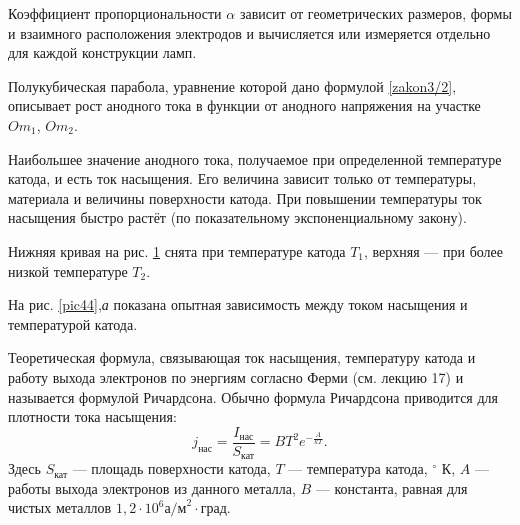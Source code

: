 \documentclass[a4paper,10pt]{book}
\begin{document}
\begin{figure}[h]
	\caption{}
	\label{pic43}
\end{figure}

Коэффициент пропорциональности $\alpha$ зависит от геометрических размеров, формы и взаимного расположения электродов и вычисляется или измеряется отдельно для каждой конструкции ламп.

Полукубическая парабола, уравнение которой дано формулой \ref{zakon3/2}, описывает рост анодного тока в функции от анодного напряжения на участке $Om_1$, $Om_2$.

Наибольшее значение анодного тока, получаемое при определенной температуре катода, и есть ток насыщения. Его величина зависит только от температуры, материала и величины поверхности катода. При повышении температуры ток насыщения быстро растёт (по показательному экспоненциальному закону).

Нижняя кривая на рис. \ref{pic43} снята при температуре катода $T_1$, верхняя — при более низкой температуре $T_2$.

На рис. \ref{pic44},\textit{а} показана опытная зависимость между током насыщения и температурой катода.

Теоретическая формула, связывающая ток насыщения, температуру катода и работу выхода электронов по энергиям согласно Ферми (см. лекцию 17) и называется формулой Ричардсона. Обычно формула Ричардсона приводится для плотности тока насыщения:
\begin{equation}
j_\text{нас} = \frac{I_\text{нас}}{S_\text{кат}} = BT^{2}e^{-\frac{A}{kT}}.
\end{equation}
Здесь $S_\text{кат}$ — площадь поверхности катода, $T$ — температура катода, $^{\circ}\text{ К}$, $A$ — работы выхода электронов из данного металла, $B$ — константа, равная для чистых металлов $1,2\cdot10^{6} \text{а/м}^{2}\cdot\text{град}$.
\end{document}
